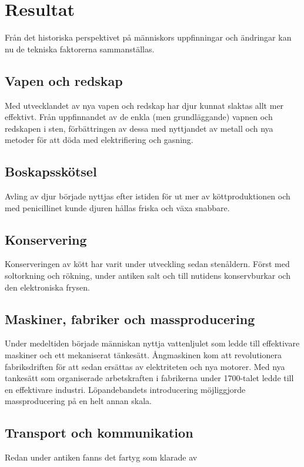 \section{Resultat}
Från det historiska perspektivet på människors uppfinningar och ändringar kan nu de tekniska faktorerna sammanställas. 

\subsection{Vapen och redskap}
Med utvecklandet av nya vapen och redskap har djur kunnat slaktas allt mer effektivt. Från uppfinnandet av de enkla (men grundläggande) vapnen och redskapen i sten, förbättringen av dessa med nyttjandet av metall och nya metoder för att döda med elektrifiering och gasning.

\subsection{Boskapsskötsel}
Avling av djur började nyttjas efter istiden för ut mer av köttproduktionen och med penicillinet kunde djuren hållas friska och växa snabbare.  

\subsection{Konservering}
Konserveringen av kött har varit under utveckling sedan stenåldern. Först med soltorkning och rökning, under antiken salt och till nutidens konservburkar och den elektroniska frysen.   

\subsection{Maskiner, fabriker och massproducering}
Under medeltiden började människan nyttja vattenljulet som ledde till effektivare maskiner och ett mekaniserat tänkesätt. Ångmaskinen kom att revolutionera fabriksdriften för att sedan ersättas av elektriteten och nya motorer. 
\newline
\newline
Med nya tankesätt som organiserade arbetskraften i fabrikerna under 1700-talet ledde till en effektivare industri. Löpandebandets introducering möjliggjorde massproducering på en helt annan skala. 

\subsection{Transport och kommunikation}
Redan under antiken fanns det fartyg som klarade av   


